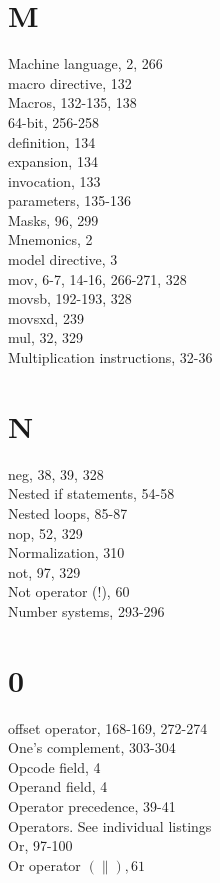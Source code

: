 \documentclass[10pt]{article}
\begin{document}
\section*{M}
Machine language, 2, 266\\
macro directive, 132\\
Macros, 132-135, 138\\
64-bit, 256-258\\
definition, 134\\
expansion, 134\\
invocation, 133\\
parameters, 135-136\\
Masks, 96, 299\\
Mnemonics, 2\\
model directive, 3\\
mov, 6-7, 14-16, 266-271, 328\\
movsb, 192-193, 328\\
movsxd, 239\\
mul, 32, 329\\
Multiplication instructions, 32-36

\section*{N}
neg, 38, 39, 328\\
Nested if statements, 54-58\\
Nested loops, 85-87\\
nop, 52, 329\\
Normalization, 310\\
not, 97, 329\\
Not operator (!), 60\\
Number systems, 293-296

\section*{0}
offset operator, 168-169, 272-274\\
One's complement, 303-304\\
Opcode field, 4\\
Operand field, 4\\
Operator precedence, 39-41\\
Operators. See individual listings\\
Or, 97-100\\
Or operator $(\|), 61$
\end{document}
